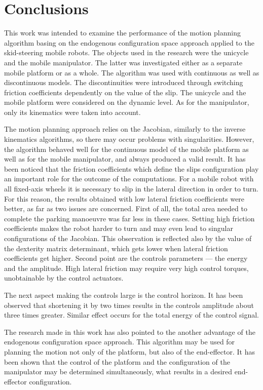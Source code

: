 \chapter{Conclusions}
\label{ch:concl}
This work was intended to examine the performance of the motion planning algorithm basing on the endogenous configuration space approach applied to the skid-steering mobile robots. The objects used in the research were the unicycle and the mobile manipulator. The latter was investigated either as a separate mobile platform or as a whole.
The algorithm was used with continuous as well as discontinuous models. The discontinuities were introduced through switching friction coefficients dependently on the value of the slip. The unicycle and the mobile platform were considered on the dynamic level. As for the manipulator, only its kinematics were taken into account.

The motion planning approach relies on the Jacobian, similarly to the inverse kinematics algorithms, so there may occur problems with singularities. However, the algorithm behaved well for the continuous model of the mobile platform as well as for the mobile manipulator, and always produced a valid result. It has been noticed that the friction coefficients which define the slips configuration play an important role for the outcome of the computations. For a mobile robot with all fixed-axis wheels it is necessary to slip in the lateral direction in order to turn. For this reason, the results obtained with low lateral friction coefficients were better, as far as two issues are concerned. First of all, the total area needed to complete the parking manoeuvre was far less in these cases. Setting high friction coefficients makes the robot harder to turn and may even lead to singular configurations of the Jacobian. This observation is reflected also by the value of the dexterity matrix determinant, which gets lower when lateral friction coefficients get higher. Second point are the controls parameters --- the energy and the amplitude. High lateral friction may require very high control torques, unobtainable by the control actuators.

The next aspect making the controls large is the control horizon. It has been observed that shortening it by two times results in the controls amplitude about three times greater. Similar effect occurs for the total energy of the control signal.

The research made in this work has also pointed to the another advantage of the endogenous configuration space approach. This algorithm may be used for planning the motion not only of the platform, but also of the end-effector. It has been shown that the control of the platform and the configuration of the manipulator may be determined simultaneously, what results in a desired end-effector configuration.

